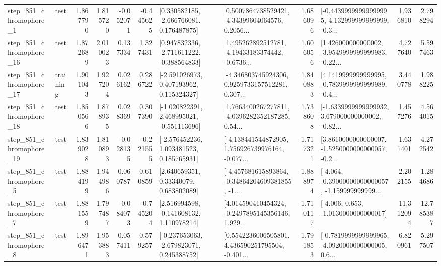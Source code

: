 \begin{tabular}{llrrrrllrlrr}
   step\_851\_chromophore\_1 &      test &      1.867790 &    1.815720 &     -0.052071 & -0.445625 &    [0.330582185, -2.666766081, 0.176487875] &  [0.5007864738529421, -4.34399604064576, 0.2056... &       1.686096 &  [-0.44399999999999995, 4.132999999999999, -0.3... &            1.936810 &          2.798294 \\
  step\_851\_chromophore\_16 &      test &      1.872689 &    2.010023 &      0.137334 &  1.327431 &   [0.947832336, -2.711611222, -0.388564833] &  [1.495262892512781, -4.19433183374442, -0.6736... &       1.606056 &  [1.426000000000002, -3.9549999999999983, -0.22... &            4.727640 &          5.597463 \\
  step\_851\_chromophore\_17 &  training &      1.901043 &    1.927204 &      0.026162 &  0.286722 &    [-2.591026973, 0.407193962, 0.115324327] &  [-4.346803745924306, 0.9259733157512281, 0.307... &       1.840883 &  [4.1419999999999995, -0.7839999999999989, -0.4... &            3.440778 &          1.988225 \\
  step\_851\_chromophore\_18 &      test &      1.850566 &    1.878935 &      0.028369 &  0.307390 &   [-1.020822391, 2.468995021, -0.551113696] &  [1.7663400267277811, -4.0396282352187285, 0.54... &       1.738608 &  [-1.6339999999999932, 3.679000000000002, -0.82... &            1.457276 &          4.564015 \\
  step\_851\_chromophore\_19 &      test &      1.839028 &    1.810893 &     -0.028135 & -0.221555 &    [-2.576452236, 1.093481523, 0.185765931] &  [-4.138441544872905, 1.756926739976164, -0.077... &       1.717321 &  [3.8610000000000007, -1.5250000000000057, -0.2... &            1.631401 &          4.272542 \\
   step\_851\_chromophore\_5 &      test &      1.884199 &    1.944986 &      0.060787 &  0.610859 &      [2.640659351, 0.33340079, 0.683802089] &  [-4.457681615893864, -0.34864204609381855, -1.... &       1.888974 &  [-4.064, -0.39000000000000057, -1.159999999999... &            2.202155 &          1.284686 \\
   step\_851\_chromophore\_7 &      test &      1.881559 &    1.797487 &     -0.084073 & -0.745204 &    [2.516994598, -0.141608132, 1.110978214] &  [4.014590410454324, -0.2497895145356146, 1.929... &       1.710117 &               [-4.006, 0.653, -1.0130000000000017] &           11.312094 &         12.785387 \\
   step\_851\_chromophore\_8 &      test &      1.896471 &    1.953883 &      0.057411 &  0.579257 &   [-0.237653063, -2.679823071, 0.245388752] &  [0.5542236006505801, 4.436590251795504, -0.401... &       1.791853 &  [-0.7819999999999965, -4.0920000000000005, 0.6... &            6.820961 &          5.297507 \\

\end{tabular}
